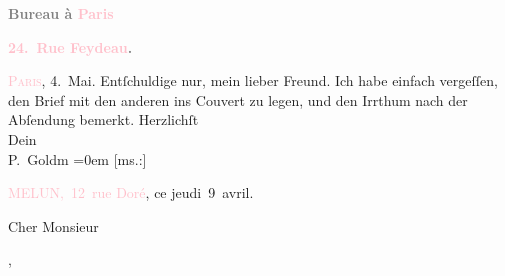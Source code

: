            \pstart
           \begin{otherlanguage}{french}\textcolor{gray}{\textbf{\textbf{Bureau à \textcolor{pink}{Paris}{}\ledrightnote{\textcolor{pink}{Paris}}}}}\end{otherlanguage}\pend
           \pstart
           \begin{otherlanguage}{french}\textcolor{gray}{\textbf{\textbf{\textcolor{pink}{24. Rue Feydeau}{}\ledrightnote{\textcolor{pink}{rue Feydeau}}.}}}\end{otherlanguage}\hfill \textsc{\textcolor{pink}{Paris}{}\ledrightnote{\textcolor{pink}{Paris}}}, 4. Mai.\pend
           \pstart
           {\pb}Entſchuldige nur, mein lieber
                  Freund. Ich habe einfach vergeſſen, den Brief mit den anderen ins Couvert
               zu legen, und den Irrthum \label{K_L02773-1v}\label{K_L02773-1h} nach der Abſendung bemerkt.\pend
           \pstart
           Herzlichſt {\\[\baselineskip]}Dein {\\[\baselineskip]}\spacefill\mbox{P. Goldm}\pend
           \leftskip=0em{}{\bigskip}\pstart
           {\pb}{[}ms.:{]} \begin{otherlanguage}{french}\textcolor{pink}{MELUN, 12 rue Doré}{}\ledrightnote{\textcolor{pink}{Rue Doré}}, ce jeudi 9 avril.\end{otherlanguage}\pend
           \pstart{}\begin{otherlanguage}{french}Cher Monsieur\end{otherlanguage},\pend\pstart
